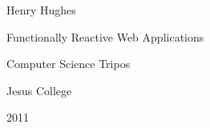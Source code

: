 \begin{titlepage}
  \begin{flushright}
    Henry Hughes
  \end{flushright}
  \vspace{2.0in}
  \begin{center}
    \Huge Functionally Reactive Web Applications
  \end{center}
  \vfill
  \begin{center}
    \large Computer Science Tripos
  \end{center}
  \vspace{0.1in}
  \begin{center}
    \large Jesus College
  \end{center}
  \vspace{0.1in}
  \begin{center}
    \large 2011
  \end{center}
\end{titlepage}
